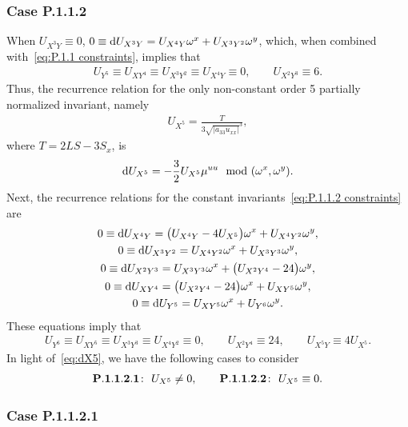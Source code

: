 \documentclass[pdftex]{sigma}%
\numberwithin{equation}{section}
\begin{document}
\subsubsection{Case P.1.1.2}

When $U_{X^3Y}\equiv 0$, $0\equiv {\rm d}U_{X^3Y} = U_{X^4Y}\omega^x + U_{X^3Y^2}\omega^y$, which, when combined with~\eqref{eq:P.1.1 constraints}, implies that
\begin{gather}\label{eq:P.1.1.2 constraints}
U_{Y^5}\equiv U_{XY^4}\equiv U_{X^3Y^2} \equiv U_{X^4Y}\equiv 0,\qquad U_{X^2Y^3}\equiv 6.
\end{gather}
%
Thus, the recurrence relation for the only non-constant order 5 partially normalized invariant, namely
\begin{gather*}
U_{X^5} = \frac{T}{3\sqrt{|a_{33}u_{xx}|}^3},
\end{gather*}
where $T=2LS-3S_x$, is
%
\begin{gather}\label{eq:dX5}
{\rm d}U_{X^5} =-\frac{3}{2}U_{X^5}\mu^{uu} \mod(\omega^x,\omega^y).
\end{gather}
%
Next, the recurrence relations for the constant invariants~\eqref{eq:P.1.1.2 constraints} are
%
\begin{gather*}
0 \equiv {\rm d}U_{X^4Y} = \big(U_{X^4Y}-4U_{X^5}\big)\omega^x+U_{X^4Y^2}\omega^y,\\
0 \equiv {\rm d}U_{X^3Y^2} = U_{X^4Y^2}\omega^x+U_{X^3Y^3}\omega^y,\\
0 \equiv {\rm d}U_{X^2Y^3} = U_{X^3Y^3}\omega^x+\big(U_{X^2Y^4}-24\big)\omega^y,\\
0 \equiv {\rm d}U_{XY^4} = \big(U_{X^2Y^4}-24\big)\omega^x+U_{XY^5}\omega^y,\\
0 \equiv {\rm d}U_{Y^5} = U_{XY^5}\omega^x + U_{Y^6}\omega^y.
\end{gather*}
%
These equations imply that
%
\begin{gather}\label{eq:P.1.1.2 order 6 constraints}
U_{Y^6}\equiv U_{XY^5}\equiv U_{X^3Y^3}\equiv U_{X^4Y^2}\equiv 0,\qquad U_{X^2Y^4}\equiv 24,\qquad U_{X^5Y}\equiv 4U_{X^5}.
\end{gather}
%
In light of~\eqref{eq:dX5}, we have the following cases to consider
\begin{gather*}
{\bf P.1.1.2.1}\colon\ U_{X^5}\neq 0,\qquad
{\bf P.1.1.2.2}\colon\ U_{X^5}\equiv 0.
\end{gather*}

\subsubsection{Case P.1.1.2.1}
\end{document}
